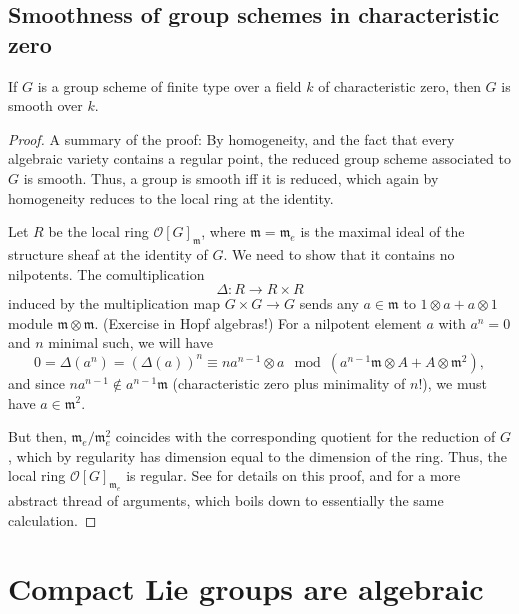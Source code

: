 \subsection{Smoothness of group schemes in characteristic zero}
\label{subsection-smoothness-characteristiczero}
\begin{theorem}
\label{theorem-smoothness-characteristiczero}
If $G$ is a group scheme of finite type over a field $k$ of characteristic zero, then $G$ is smooth over $k$. 
\end{theorem}

\begin{proof}
A summary of the proof: By homogeneity, and the fact that every algebraic variety contains a regular point, the reduced group scheme associated to $G$ is smooth. Thus, a group is smooth iff it is reduced, which again by homogeneity reduces to the local ring at the identity. 

Let $R$ be the local ring $\mathcal O[G]_{\mathfrak m}$, where $\mathfrak m=\mathfrak m_e$ is the maximal ideal of the structure sheaf at the identity of $G$. We need to show that it contains no nilpotents. The comultiplication
$$ \Delta: R\to R\times R$$
induced by the multiplication map $G\times G\to G$ sends any $a\in \mathfrak m$ to $1\otimes a + a \otimes 1$ module $\mathfrak m \otimes \mathfrak m$. (Exercise in Hopf algebras!) For a nilpotent element $a$ with $a^n=0$ and $n$ minimal such, we will have 
$$ 0=\Delta(a^n)=(\Delta(a))^n \equiv na^{n-1} \otimes a \mod \left( a^{n-1}\mathfrak m \otimes A + A \otimes \mathfrak m^2 \right),$$
and since $na^{n-1} \notin a^{n-1} \mathfrak m$ (characteristic zero plus minimality of $n$!), we must have $a\in \mathfrak m^2$. 

But then, $\mathfrak m_e/\mathfrak m_e^2$ coincides with the corresponding quotient for the reduction of $G$, which by regularity has dimension equal to the dimension of the ring. Thus, the local ring $\mathcal O[G]_{\mathfrak m_e}$ is regular. See \cite[\S VI.9]{Milne-AGS} for details on this proof, and \cite[\href{https://stacks.math.columbia.edu/tag/047N}{Tag 047N}]{stacks-project} for a more abstract thread of arguments, which boils down to essentially the same calculation.
\end{proof}






\section{Compact Lie groups are algebraic}
\label{section-compact-algebraic}



